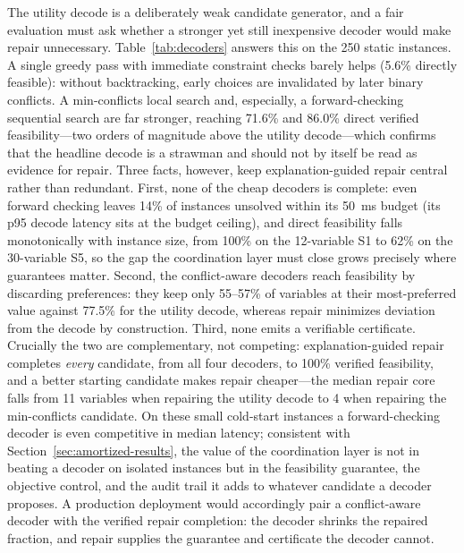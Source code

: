 \documentclass[pdflatex,sn-mathphys-num,iicol,oneside]{sn-jnl}
\begin{document}
The utility decode is a deliberately weak candidate generator, and a
fair evaluation must ask whether a stronger yet still inexpensive
decoder would make repair unnecessary. Table~\ref{tab:decoders} answers
this on the 250 static instances. A single greedy pass with immediate
constraint checks barely helps (5.6\% directly feasible): without
backtracking, early choices are invalidated by later binary conflicts.
A min-conflicts local search and, especially, a forward-checking
sequential search are far stronger, reaching 71.6\% and 86.0\% direct
verified feasibility---two orders of magnitude above the utility
decode---which confirms that the headline decode is a strawman and
should not by itself be read as evidence for repair. Three facts,
however, keep explanation-guided repair central rather than redundant.
First, none of the cheap decoders is complete: even forward checking
leaves 14\% of instances unsolved within its 50~ms budget (its p95
decode latency sits at the budget ceiling), and direct feasibility
falls monotonically with instance size, from 100\% on the 12-variable
S1 to 62\% on the 30-variable S5, so the gap the coordination layer
must close grows precisely where guarantees matter. Second, the
conflict-aware decoders reach feasibility by discarding preferences:
they keep only 55--57\% of variables at their most-preferred value
against 77.5\% for the utility decode, whereas repair minimizes
deviation from the decode by construction. Third, none emits a
verifiable certificate. Crucially the two are complementary, not
competing: explanation-guided repair completes \emph{every} candidate,
from all four decoders, to 100\% verified feasibility, and a better
starting candidate makes repair cheaper---the median repair core falls
from 11 variables when repairing the utility decode to 4 when repairing
the min-conflicts candidate. On these small cold-start instances a
forward-checking decoder is even competitive in median latency;
consistent with Section~\ref{sec:amortized-results}, the value of the
coordination layer is not in beating a decoder on isolated instances
but in the feasibility guarantee, the objective control, and the audit
trail it adds to whatever candidate a decoder proposes. A production
deployment would accordingly pair a conflict-aware decoder with the
verified repair completion: the decoder shrinks the repaired fraction,
and repair supplies the guarantee and certificate the decoder cannot.
\end{document}
